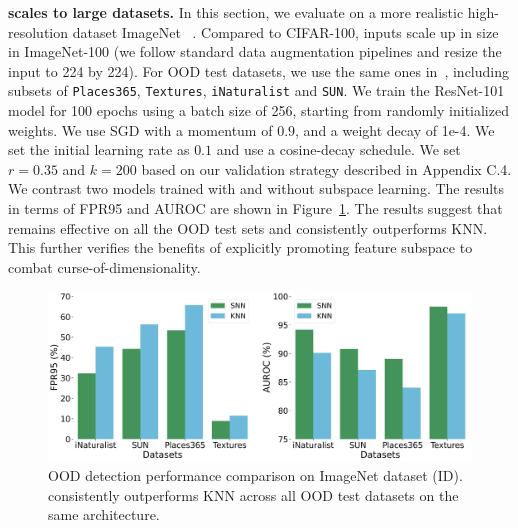 \vspace{0.1cm}
\noindent\textbf{\name scales to large datasets.} 
In this section, we evaluate \name on a more realistic high-resolution dataset ImageNet ~\cite{deng2009imagenet}. Compared to CIFAR-100, inputs scale up in size in ImageNet-100 (we follow standard data augmentation pipelines and resize the input to 224 by 224). For OOD test datasets, we use the same ones in~\cite{huang2021mos}, including subsets of \texttt{Places365}, \texttt{Textures}, \texttt{iNaturalist} and \texttt{SUN}. 
We train the ResNet-101 model for 100 epochs using a batch size of 256, starting from randomly initialized weights. We use SGD with a momentum of $0.9$, and a weight decay of 1e-4. We set the initial learning rate as $0.1$ and use a cosine-decay schedule. We set $r = 0.35$ and $k = 200$ based on our validation strategy described in Appendix C.4. We contrast two models trained with and without subspace learning. The results in terms of FPR95 and AUROC are shown in Figure~\ref{fig:imagenet}. The results suggest that \name remains effective on all the OOD test sets and consistently outperforms KNN. This further verifies the benefits of explicitly promoting feature subspace to combat curse-of-dimensionality. 

\begin{figure}[t]
    \centering
    \includegraphics[width = \linewidth]{images/imagenet_plot.pdf}
    \caption{\small OOD detection performance comparison on ImageNet dataset (ID). \name consistently outperforms KNN across all OOD test datasets on the same architecture.  }
   
    \label{fig:imagenet}
\end{figure}


